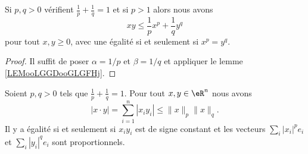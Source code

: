 \begin{corollary}       \label{CORooTCBZooAcZxaC}
    Si \( p,q>0\) vérifient \( \frac{1}{ p }+\frac{1}{ q }=1\) et si \( p>1\) alors nous avons
    \begin{equation}        \label{EQooWKTSooQwRsLz}
        xy\leq \frac{1}{ p }x^{p}+\frac{1}{ q }y^q
    \end{equation}
    pour tout \( x,y\geq 0\), avec une égalité si et seulement si \( x^p=y^q\).
\end{corollary}

\begin{proof}
    Il suffit de poser \( \alpha=1/p\) et \( \beta=1/q\) et appliquer le lemme \ref{LEMooLGGDooGLGFHj}.
\end{proof}

\begin{theorem}        \label{THOooYHMJooBlXfpl}
    Soient \( p,q>0\) tels que \( \frac{1}{ p }+\frac{1}{ q }=1\). Pour tout \( x,y\in \eR^n\) nous avons
    \begin{equation}
        | x\cdot y |=\sum_{i=1}^n| x_iy_i |\leq \| x \|_p\| x \|_q.
    \end{equation}
    Il y a égalité si et seulement si \( x_iy_i\) est de signe constant et les vecteurs \( \sum_i| x_i |^pe_i\) et \( \sum_i| y_i |^qe_i\) sont proportionnels.
\end{theorem}

